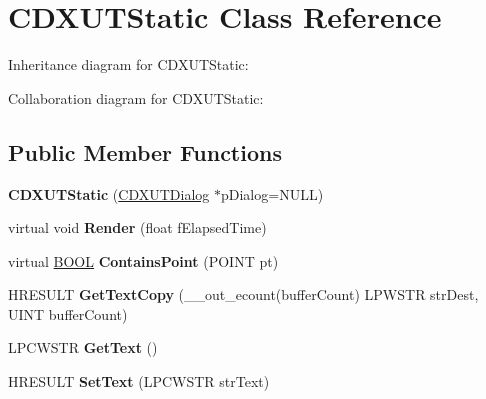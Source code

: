 \hypertarget{class_c_d_x_u_t_static}{\section{C\+D\+X\+U\+T\+Static Class Reference}
\label{class_c_d_x_u_t_static}
}


Inheritance diagram for C\+D\+X\+U\+T\+Static\+:


Collaboration diagram for C\+D\+X\+U\+T\+Static\+:
\subsection*{Public Member Functions}
\begin{DoxyCompactItemize}
\item 
\hypertarget{class_c_d_x_u_t_static_ac0533bb16db426e6a3f4e180f0a18fc4}{{\bfseries C\+D\+X\+U\+T\+Static} (\hyperlink{class_c_d_x_u_t_dialog}{C\+D\+X\+U\+T\+Dialog} $\ast$p\+Dialog=N\+U\+L\+L)}\label{class_c_d_x_u_t_static_ac0533bb16db426e6a3f4e180f0a18fc4}

\item 
\hypertarget{class_c_d_x_u_t_static_a2f6bbc1bbebd100044448114325f9206}{virtual void {\bfseries Render} (float f\+Elapsed\+Time)}\label{class_c_d_x_u_t_static_a2f6bbc1bbebd100044448114325f9206}

\item 
\hypertarget{class_c_d_x_u_t_static_ae32024764670a1f5b1ad0ba4a8570d63}{virtual \hyperlink{_ice_types_8h_a050c65e107f0c828f856a231f4b4e788}{B\+O\+O\+L} {\bfseries Contains\+Point} (P\+O\+I\+N\+T pt)}\label{class_c_d_x_u_t_static_ae32024764670a1f5b1ad0ba4a8570d63}

\item 
\hypertarget{class_c_d_x_u_t_static_ae407811e909cfa84bdfacdde3811a26e}{H\+R\+E\+S\+U\+L\+T {\bfseries Get\+Text\+Copy} (\+\_\+\+\_\+out\+\_\+ecount(buffer\+Count) L\+P\+W\+S\+T\+R str\+Dest, U\+I\+N\+T buffer\+Count)}\label{class_c_d_x_u_t_static_ae407811e909cfa84bdfacdde3811a26e}

\item 
\hypertarget{class_c_d_x_u_t_static_a3da09900b41866941215aacc9da64803}{L\+P\+C\+W\+S\+T\+R {\bfseries Get\+Text} ()}\label{class_c_d_x_u_t_static_a3da09900b41866941215aacc9da64803}

\item 
\hypertarget{class_c_d_x_u_t_static_ac5dd2c6b2a9da5eeb57ad377286ac568}{H\+R\+E\+S\+U\+L\+T {\bfseries Set\+Text} (L\+P\+C\+W\+S\+T\+R str\+Text)}\label{class_c_d_x_u_t_static_ac5dd2c6b2a9da5eeb57ad377286ac568}

\end{DoxyCompactItemize}
